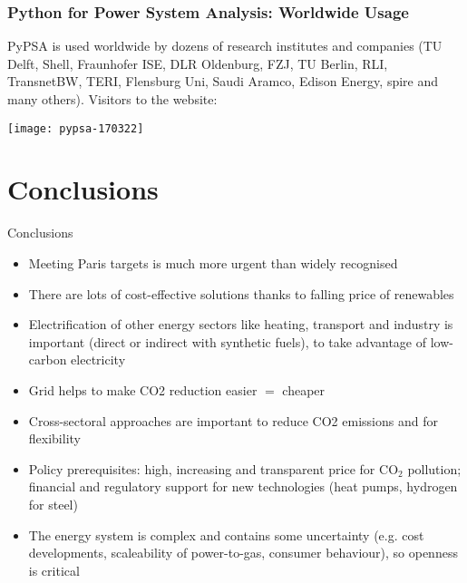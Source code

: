 \documentclass[10pt,aspectratio=169,dvipsnames]{beamer}
\def\co2{CO${}_2$}
\let\olditem\item
\renewcommand{\item}{%
\olditem\vspace{5pt}}
\begin{document}
\begin{frame}
  \frametitle{Python for Power System Analysis: Worldwide Usage}

  PyPSA is used worldwide by \alert{dozens of research institutes and companies} (TU Delft, Shell, Fraunhofer ISE, DLR Oldenburg, FZJ, TU Berlin, RLI, TransnetBW, TERI, Flensburg Uni, Saudi Aramco, Edison Energy, spire and many others). Visitors to the website:

  \centering
  \texttt{[image: pypsa-170322]}


\end{frame}



\section{Conclusions}

\begin{frame}{Conclusions}

  \begin{itemize}
    \item Meeting \alert{Paris targets} is much more urgent than widely recognised

    \item There are \alert{lots of cost-effective solutions} thanks to falling price of renewables

    \item \alert{Electrification of other energy sectors} like heating,
      transport and industry is important (direct or indirect with synthetic fuels),  to take advantage of
      low-carbon electricity

    \item \alert{Grid helps} to make CO2 reduction easier $=$ cheaper


    \item \alert{Cross-sectoral} approaches are important to reduce
      CO2 emissions \alert{and} for flexibility

    \item \alert{Policy prerequisites}: high, increasing and
      transparent \alert{price for \co2{} pollution}; financial and regulatory support for \alert{new technologies} (heat pumps, hydrogen for steel)

    \item The energy system is complex and contains some uncertainty
      (e.g. cost developments, scaleability of power-to-gas, consumer behaviour), so
      \alert{openness is critical}

  \end{itemize}

\end{frame}
\end{document}
